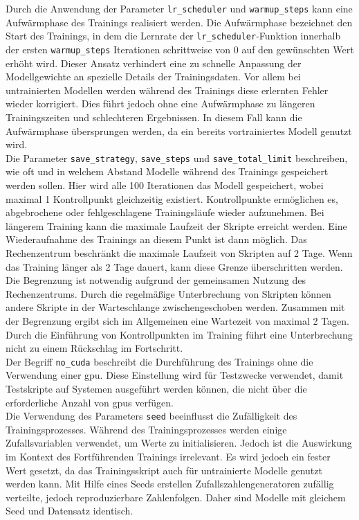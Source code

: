 Durch die Anwendung der Parameter \texttt{lr\_scheduler} und \texttt{warmup\_steps} kann eine Aufwärmphase des Trainings realisiert werden.
Die Aufwärmphase bezeichnet den Start des Trainings, in dem die Lernrate der \texttt{lr\_scheduler}-Funktion innerhalb der ersten \texttt{warmup\_steps} Iterationen schrittweise von $0$ auf den gewünschten Wert erhöht wird.
Dieser Ansatz verhindert eine zu schnelle Anpassung der Modellgewichte an spezielle Details der Trainingsdaten.
Vor allem bei untrainierten Modellen werden während des Trainings diese erlernten Fehler wieder korrigiert. Dies führt jedoch ohne eine Aufwärmphase zu längeren Trainingszeiten und schlechteren Ergebnissen.
In diesem Fall kann die Aufwärmphase übersprungen werden, da ein bereits vortrainiertes Modell genutzt wird.\\

Die Parameter \texttt{save\_strategy}, \texttt{save\_steps} und \texttt{save\_total\_limit} beschreiben, wie oft und in welchem Abstand Modelle während des Trainings gespeichert werden sollen.
Hier wird alle 100 Iterationen das Modell gespeichert, wobei maximal 1 Kontrollpunkt gleichzeitig existiert.
Kontrollpunkte ermöglichen es, abgebrochene oder fehlgeschlagene Trainingsläufe wieder aufzunehmen.
Bei längerem Training kann die maximale Laufzeit der Skripte erreicht werden.
Eine Wiederaufnahme des Trainings an diesem Punkt ist dann möglich.
Das Rechenzentrum beschränkt die maximale Laufzeit von Skripten auf 2 Tage.
Wenn das Training länger als 2 Tage dauert, kann diese Grenze überschritten werden.
Die Begrenzung ist notwendig aufgrund der gemeinsamen Nutzung des Rechenzentrums.
Durch die regelmäßige Unterbrechung von Skripten können andere Skripte in der Warteschlange zwischengeschoben werden.
Zusammen mit der Begrenzung ergibt sich im Allgemeinen eine Wartezeit von maximal 2 Tagen.
Durch die Einführung von Kontrollpunkten im Training führt eine Unterbrechung nicht zu einem Rückschlag im Fortschritt.\\

Der Begriff \texttt{no\_cuda} beschreibt die Durchführung des Trainings ohne die Verwendung einer \ac{gpu}.
Diese Einstellung wird für Testzwecke verwendet, damit Testskripte auf Systemen ausgeführt werden können, die nicht über die erforderliche Anzahl von \ac{gpu}s verfügen.\\

Die Verwendung des Parameters \texttt{seed} beeinflusst die Zufälligkeit des Trainingsprozesses.
Während des Trainingsprozesses werden einige Zufallsvariablen verwendet, um Werte zu initialisieren.
Jedoch ist die Auswirkung im Kontext des Fortführenden Trainings irrelevant.
Es wird jedoch ein fester Wert gesetzt, da das Trainingsskript auch für untrainierte Modelle genutzt werden kann.
Mit Hilfe eines Seeds erstellen Zufallszahlengeneratoren zufällig verteilte, jedoch reproduzierbare Zahlenfolgen.
Daher sind Modelle mit gleichem Seed und Datensatz identisch.\\

